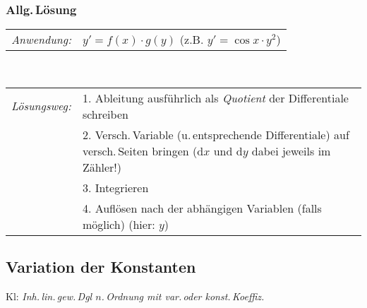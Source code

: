 \documentclass[a4paper,10pt,titlepage]{scrartcl}
\begin{document}
\subsubsection*{Allg.\,Lösung}
\begin{tabular}{ll}
 \emph{Anwendung:}
&
 $y'=f(x)\cdot g(y)$ \qquad (z.B. $y'=\cos x\cdot y^2$)
\\
\end{tabular}
\smallskip\\
\begin{tabular}{ll}
 \emph{Lösungsweg:}
& 1. Ableitung ausführlich als \emph{Quotient} der Differentiale schreiben
\\
& 2. Versch.\,Variable (u.\,entsprechende Differentiale) auf versch.\,Seiten bringen ($\mathrm{d}x$ und $\mathrm{d}y$ dabei jeweils im Zähler!)
\\
& 3. Integrieren
\\
& 4. Auflösen nach der abhängigen Variablen (falls möglich) (hier: $y$)
\\
\end{tabular}


\subsection*{Variation der Konstanten}
\label{sec:variation_der_konstanten}
Kl: \emph{Inh.\,lin.\,gew.\,Dgl $n$.\,Ordnung mit var.\,oder konst.\,Koeffiz.}
\end{document}
